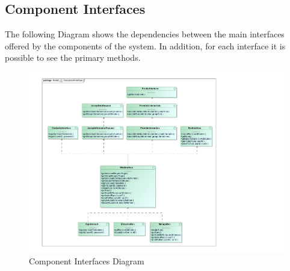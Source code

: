 \subsection{Component Interfaces}
The following Diagram shows the dependencies between the main interfaces offered by the components of the system. In addition, for each interface it is possible to see the primary methods. 
\\[0.5cm]
\begin{figure}[H]
\centering
\includegraphics[scale=0.8, angle=0,origin=c]{Images/ComponentInterface.pdf}
\caption{Component Interfaces Diagram}
\end{figure}

